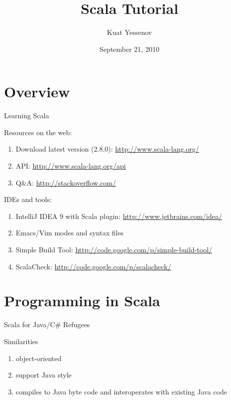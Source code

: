 \documentclass[serif,t,11pt]{beamer}
\author{Kuat Yessenov}
\title{Scala Tutorial}
\date{September 21, 2010}
\begin{document}
\maketitle

\section{Overview}
\begin{frame}{Learning Scala}

Resources on the web:
\begin{enumerate}
\item Download latest version (2.8.0): \url{http://www.scala-lang.org/}
\item API: \url{http://www.scala-lang.org/api}
\item Q\&A: \url{http://stackoverflow.com/}
\end{enumerate}

IDEs and tools:
\begin{enumerate}
\item IntelliJ IDEA 9 with Scala plugin: \url{http://www.jetbrains.com/idea/}
\item Emacs/Vim modes and syntax files
\item Simple Build Tool: \url{http://code.google.com/p/simple-build-tool/}
\item ScalaCheck: \url{http://code.google.com/p/scalacheck/}
\end{enumerate}
\end{frame}

\section{Programming in Scala}

\begin{frame}{Scala for Java/C\# Refugees}
\begin{alertblock}{Similarities}
\begin{enumerate}
\item object-oriented
\item support Java style 
\item compiles to Java byte code and interoperates with existing Java code
\end{enumerate}
\end{alertblock}
\end{frame}
\end{document}
